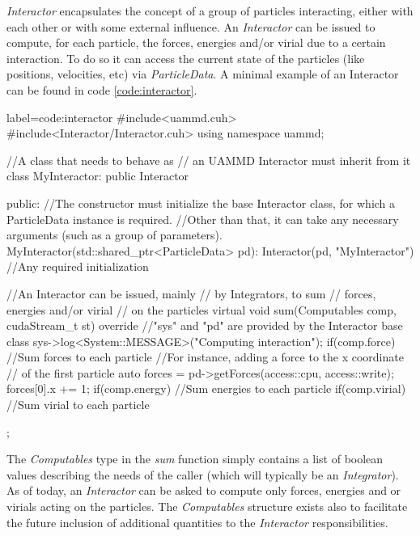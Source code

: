\documentclass[ twoside,openright,titlepage,numbers=noenddot,%
headinclude,footinclude,cleardoublepage=empty,abstract=on,
BCOR=5mm,paper=a4,fontsize=11pt, dvipsnames
]{scrreprt}
\begin{document}
\emph{Interactor} encapsulates the concept of a group of particles interacting, either with each other or with some external influence.
An \emph{Interactor} can be issued to compute, for each particle, the forces, energies and/or virial due to a certain interaction.
To do so it can access the current state of the particles (like positions, velocities, etc) via \emph{ParticleData}.
A minimal example of an Interactor can be found in code \ref{code:interactor}.
\begin{code2}
  {label=code:interactor}
#include<uammd.cuh>
#include<Interactor/Interactor.cuh>
using namespace uammd;

//A class that needs to behave as 
// an UAMMD Interactor must inherit from it
class MyInteractor: public Interactor{
  public:
  //The constructor must initialize the base Interactor class, for which a ParticleData instance is required.
  //Other than that, it can take any necessary arguments (such as a group of parameters).
  MyInteractor(std::shared_ptr<ParticleData> pd):
          Interactor(pd, "MyInteractor"){
    //Any required initialization 
  }

  //An Interactor can be issued, mainly
  // by Integrators, to sum
  // forces, energies and/or virial
  // on the particles
  virtual void sum(Computables comp, cudaStream_t st) override{
    //"sys" and "pd" are provided by the Interactor base class
    sys->log<System::MESSAGE>("Computing interaction");
    if(comp.force){
      //Sum forces to each particle
      //For instance, adding a force to the x coordinate
      // of the first particle
      auto forces = pd->getForces(access::cpu, access::write);
      forces[0].x += 1;
    }
    if(comp.energy){
      //Sum energies to each particle
    }
    if(comp.virial){
      //Sum virial to each particle
    }
  }
};

\end{code2}

The \emph{Computables} type in the \emph{sum} function simply contains a list of boolean values describing the needs of the caller (which will typically be an \emph{Integrator}). As of today, an \emph{Interactor} can be asked to compute only forces, energies and or virials acting on the particles. The \emph{Computables} structure exists also to facilitate the future inclusion of additional quantities to the \emph{Interactor} responsibilities.
\end{document}
